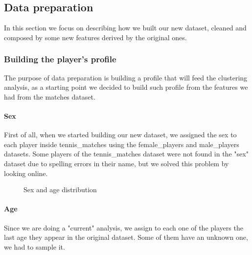 \subsection{Data preparation}
In this section we focus on describing how we built our new dataset, cleaned and composed by some new features derived by the original ones.

\subsubsection{Building the player's profile}
The purpose of data preparation is building a profile that will feed the clustering analysis, as a starting point we decided to build such profile from the features we had from the matches dataset.

\paragraph{Sex}
First of all, when we started building our new dataset, we assigned the sex to each player inside tennis\_matches using the female\_players and male\_players datasets. Some players of the tennis\_matches dataset were not found in the "sex" dataset due to spelling errors in their name, but we solved this problem by looking online.
\begin{figure}[H]
    \centering
    \caption{Sex and age distribution}
    \label{fig:sex_age_feature}
\end{figure}
\paragraph{Age}
Since we are doing a "current" analysis, we assign to each one of the players the last age they appear in the original dataset. Some of them have an unknown one, we had to sample it.


